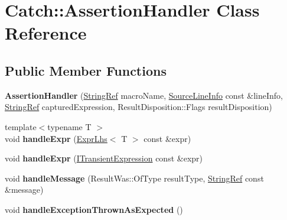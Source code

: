 \hypertarget{class_catch_1_1_assertion_handler}{}\section{Catch\+:\+:Assertion\+Handler Class Reference}
\label{class_catch_1_1_assertion_handler}
\subsection*{Public Member Functions}
\begin{DoxyCompactItemize}
\item 
\mbox{\label{class_catch_1_1_assertion_handler_a74627e1e399b026e9acbaf95ea673643}} 
{\bfseries Assertion\+Handler} (\mbox{\hyperlink{class_catch_1_1_string_ref}{String\+Ref}} macro\+Name, \mbox{\hyperlink{struct_catch_1_1_source_line_info}{Source\+Line\+Info}} const \&line\+Info, \mbox{\hyperlink{class_catch_1_1_string_ref}{String\+Ref}} captured\+Expression, Result\+Disposition\+::\+Flags result\+Disposition)
\item 
\mbox{\label{class_catch_1_1_assertion_handler_a2ef387e567bad90ec6e4b5bf5c367388}} 
{\footnotesize template$<$typename T $>$ }\\void {\bfseries handle\+Expr} (\mbox{\hyperlink{class_catch_1_1_expr_lhs}{Expr\+Lhs}}$<$ T $>$ const \&expr)
\item 
\mbox{\label{class_catch_1_1_assertion_handler_afe14d9cf1b1c7f70dae439fbdb51d0c4}} 
void {\bfseries handle\+Expr} (\mbox{\hyperlink{struct_catch_1_1_i_transient_expression}{I\+Transient\+Expression}} const \&expr)
\item 
\mbox{\label{class_catch_1_1_assertion_handler_abdb4c180ed83ec2858b2fb87712c516d}} 
void {\bfseries handle\+Message} (Result\+Was\+::\+Of\+Type result\+Type, \mbox{\hyperlink{class_catch_1_1_string_ref}{String\+Ref}} const \&message)
\item 
\mbox{\label{class_catch_1_1_assertion_handler_ab6caf765764a4064e90fce829eec201d}} 
void {\bfseries handle\+Exception\+Thrown\+As\+Expected} ()
\item 

\end{DoxyCompactItemize}
